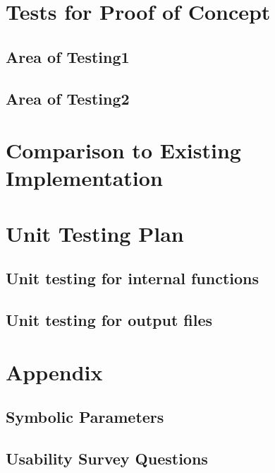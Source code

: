 \documentclass{article}
\begin{document}
\section{Tests for Proof of Concept}
\subsection{Area of Testing1}
\subsection{Area of Testing2}

\section{Comparison to Existing Implementation}

\section{Unit Testing Plan}
\subsection{Unit testing for internal functions}
\subsection{Unit testing for output files}

\section{Appendix}
\subsection{Symbolic Parameters}
\subsection{Usability Survey Questions}
\end{document}
